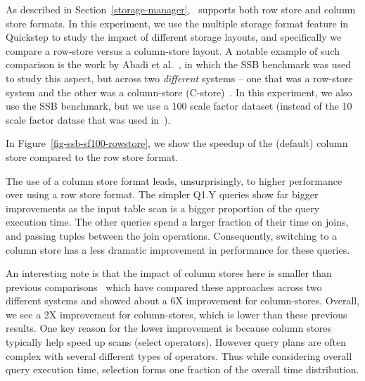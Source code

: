As described in Section~\ref{storage-manager}, \Quickstep\ supports both row store and column store formats. %
In this experiment, we use the multiple storage format feature in Quickstep to study the impact of different storage layouts, and specifically we compare a row-store versus a column-store layout. A notable example of such comparison is the work by Abadi et al.~\cite{DBLP:conf/sigmod/AbadiMH08}, in which the SSB benchmark was used to study this aspect, but across two \textit{different} systems -- one that was a row-store system and the other was a column-store (C-store)~\cite{StonebrakerABCCFLLMOORTZ05}.  In this experiment, we also use the SSB benchmark, but we use a 100 scale factor dataset (instead of the 10 scale factor datase that was used in~\cite{DBLP:conf/sigmod/AbadiMH08}).

In Figure~\ref{fig-ssb-sf100-rowstore}, we show the speedup of the (default) column store compared to the row store format.


The use of a column store format leads, unsurprisingly, to higher performance over using a row store format. %
The simpler Q1.Y queries show far bigger improvements as the input table scan is a bigger proportion of the query execution time. The other queries spend a larger fraction of their time on joins, and passing tuples between the join operations. Consequently, switching to a column store has a less dramatic improvement in performance for these queries.

An interesting note is that the impact of column stores here is  smaller than previous comparisons~\cite{DBLP:conf/sigmod/AbadiMH08} which have compared these approaches across two different systems and showed about a 6X improvement for column-stores. Overall, we see a 2X improvement for column-stores, which is lower than these previous results.
One key reason for the lower improvement is because column stores typically help speed up scans (select operators).
However query plans are often complex with several different types of operators. 
Thus while considering overall query execution time, selection forms one fraction of the overall time distribution. 

